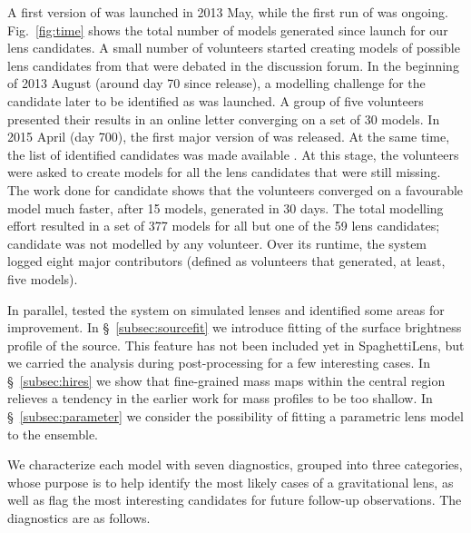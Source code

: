 A first version of \SpL was launched in 2013 May, while
the first run of \SW was ongoing.  Fig.~\ref{fig:time} shows the
total number of models generated since launch for our lens candidates.
A small number of volunteers started creating models of possible lens
candidates from \SW that were debated in the discussion forum.  In the
beginning of 2013 August (around day 70 since release), a modelling
challenge for the candidate later to be identified as  was
launched.  A group of five volunteers presented their results in an
online letter
converging on a set of 30 models. In 2015 April (day 700),
the first major version of \SpL was released. At the same time,
the list of identified candidates was made available \citep[as a preprint
  of][]{2016MNRAS.455.1191M}.  At this stage, the volunteers were
asked to create models for all the lens candidates that were still
missing.  The work done for candidate  shows that the
volunteers converged on a favourable model much faster, after 15
models, generated in 30 days.  The total modelling effort resulted in
a set of 377 \SpL models for all but one of the 59 \SW lens
candidates; candidate  was not modelled by any volunteer.  Over
its runtime, the system logged eight major contributors (defined as
volunteers that generated, at least, five models).

In parallel, \citet{2015MNRAS.447.2170K} tested the system on
simulated lenses and identified some areas for improvement.  In
\S~\ref{subsec:sourcefit} we introduce fitting of the surface
brightness profile of the source.  This feature has not been included
yet in SpaghettiLens, but we carried the analysis during
post-processing for a few interesting cases.  In \S~\ref{subsec:hires}
we show that fine-grained mass maps within the central region
relieves a tendency in the earlier work for mass profiles to be too
shallow. In \S~\ref{subsec:parameter} we consider the possibility
of fitting a parametric lens model to the ensemble.

We characterize each model with seven diagnostics, grouped into three
categories, whose purpose is to help identify the most likely cases of
a gravitational lens, as well as flag the most interesting candidates
for future follow-up observations. The diagnostics are as follows.

